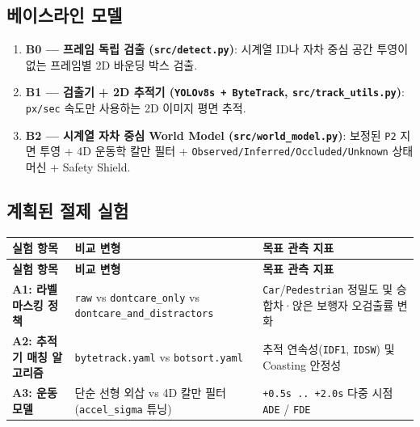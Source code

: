 \documentclass[10.5pt,a4paper]{article}
\begin{document}
\subsection{베이스라인 모델}
\begin{enumerate}[leftmargin=1.8em,itemsep=2pt]
\item \textbf{B0 --- 프레임 독립 검출 (\texttt{src/\allowbreak{}detect.\allowbreak{}py})}: 시계열 ID나 자차 중심 공간 투영이 없는 프레임별 2D 바운딩 박스 검출.
\item \textbf{B1 --- 검출기 + 2D 추적기 (\texttt{YOLOv8s + ByteTrack}, \texttt{src/\allowbreak{}track\_\allowbreak{}utils.\allowbreak{}py})}: \texttt{px/\allowbreak{}sec} 속도만 사용하는 2D 이미지 평면 추적.
\item \textbf{B2 --- 시계열 자차 중심 World Model (\texttt{src/\allowbreak{}world\_\allowbreak{}model.\allowbreak{}py})}: 보정된 \texttt{P2} 지면 투영 + 4D 운동학 칼만 필터 + \texttt{Observed/\allowbreak{}Inferred/\allowbreak{}Occluded/\allowbreak{}Unknown} 상태 머신 + Safety Shield.
\end{enumerate}

\subsection{계획된 절제 실험}

\begin{footnotesize}
\setlength{\tabcolsep}{4pt}
\setlength{\LTleft}{0pt}\setlength{\LTright}{0pt}
\begin{longtable}{>{\raggedright\arraybackslash}p{} >{\raggedright\arraybackslash}p{} >{\raggedright\arraybackslash}p{}}
\toprule
\textbf{실험 항목} & \textbf{비교 변형} & \textbf{목표 관측 지표} \\
\midrule
\endfirsthead
\toprule
\textbf{실험 항목} & \textbf{비교 변형} & \textbf{목표 관측 지표} \\
\midrule
\endhead
\bottomrule
\endfoot
\textbf{A1: 라벨 마스킹 정책} & \texttt{raw} vs \texttt{dontcare\_\allowbreak{}only} vs \texttt{dontcare\_\allowbreak{}and\_\allowbreak{}distractors} & \texttt{Car}/\texttt{Pedestrian} 정밀도 및 승합차·앉은 보행자 오검출률 변화 \\
\textbf{A2: 추적기 매칭 알고리즘} & \texttt{bytetrack.\allowbreak{}yaml} vs \texttt{botsort.\allowbreak{}yaml} & 추적 연속성(\texttt{IDF1}, \texttt{IDSW}) 및 Coasting 안정성 \\
\textbf{A3: 운동 모델} & 단순 선형 외삽 vs 4D 칼만 필터 (\texttt{accel\_\allowbreak{}sigma} 튜닝) & \texttt{+0.\allowbreak{}5s .\allowbreak{}.\allowbreak{} +2.\allowbreak{}0s} 다중 시점 \texttt{ADE} / \texttt{FDE} \\
\end{longtable}
\end{footnotesize}
\end{document}
